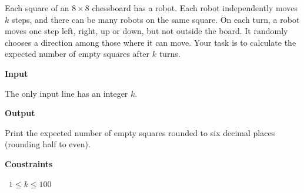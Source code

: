 Each square of an $8 \times 8$ chessboard has a robot. Each robot independently moves $k$ steps, and there can be many robots on the same square.
On each turn, a robot moves one step left, right, up or down, but not outside the board. It randomly chooses a direction among those where it can move.
Your task is to calculate the expected number of empty squares after $k$ turns.

\vspace{0.3cm}\noindent\textbf{Input}

The only input line has an integer $k$.

\vspace{0.3cm}\noindent\textbf{Output}

Print the expected number of empty squares rounded to six decimal places (rounding half to even).

\vspace{0.3cm}\noindent\textbf{Constraints}

\textbullet\ $1 \le k \le 100$